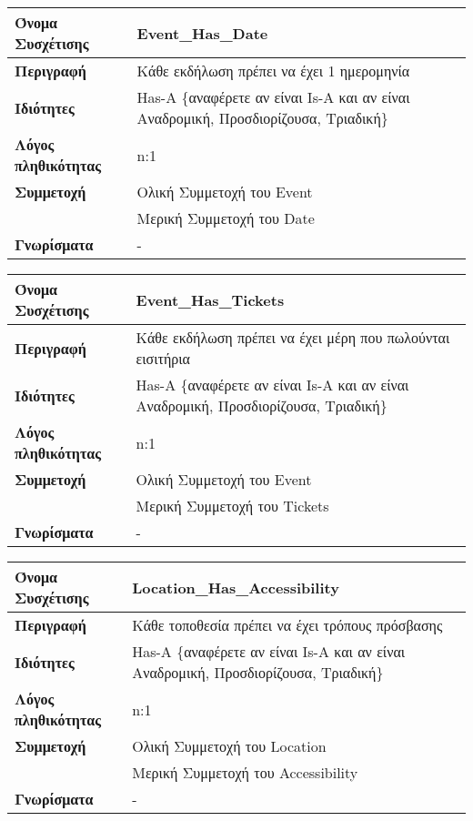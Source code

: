 \begin{tabular}[]{|p{4cm}|p{10cm}|}
  \hline
  \textbf{Όνομα Συσχέτισης} & Event\_Has\_Date\\ \hline
  \textbf{Περιγραφή} & Κάθε εκδήλωση πρέπει να έχει 1 ημερομηνία\\ \hline
  \textbf{Ιδιότητες} & Has-A \{αναφέρετε αν είναι Is-A και αν είναι
                       Αναδρομική, Προσδιορίζουσα, Τριαδική\} \\ \hline
  \textbf{Λόγος πληθικότητας} & n:1 \\ \hline
  \textbf{Συμμετοχή} & Ολική Συμμετοχή του Event \\ \cline{2-2}
                     & Μερική Συμμετοχή του Date \\ \hline
  \textbf{Γνωρίσματα} & - \\ \hline
\end{tabular}

\begin{tabular}[]{|p{4cm}|p{10cm}|}
  \hline
  \textbf{Όνομα Συσχέτισης} & Event\_Has\_Tickets\\ \hline
  \textbf{Περιγραφή} & Κάθε εκδήλωση πρέπει να έχει μέρη που πωλούνται εισιτήρια\\ \hline
  \textbf{Ιδιότητες} & Has-A \{αναφέρετε αν είναι Is-A και αν είναι
                       Αναδρομική, Προσδιορίζουσα, Τριαδική\} \\ \hline
  \textbf{Λόγος πληθικότητας} & n:1 \\ \hline
  \textbf{Συμμετοχή} & Ολική Συμμετοχή του Event \\ \cline{2-2}
                     & Μερική Συμμετοχή του Tickets\\ \hline
  \textbf{Γνωρίσματα} & - \\ \hline
\end{tabular}

\begin{tabular}[]{|p{4cm}|p{10cm}|}
  \hline
  \textbf{Όνομα Συσχέτισης} & Location\_Has\_Accessibility\\ \hline
  \textbf{Περιγραφή} & Κάθε τοποθεσία πρέπει να έχει τρόπους πρόσβασης\\ \hline
  \textbf{Ιδιότητες} & Has-A \{αναφέρετε αν είναι Is-A και αν είναι
                       Αναδρομική, Προσδιορίζουσα, Τριαδική\} \\ \hline
  \textbf{Λόγος πληθικότητας} & n:1 \\ \hline
  \textbf{Συμμετοχή} & Ολική Συμμετοχή του Location \\ \cline{2-2}
                     & Μερική Συμμετοχή του Accessibility\\ \hline
  \textbf{Γνωρίσματα} & - \\ \hline
\end{tabular}

